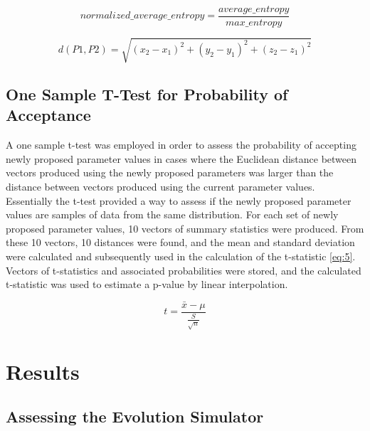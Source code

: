 \documentclass[10pt]{article}
\begin{document}
\begin{equation}
	normalized\_average\_entropy = \frac{average\_entropy}{max\_entropy}
	\label{eq:3}
\end{equation}

\begin{equation}
	d(P1,P2) = \sqrt{(x_2-x_1)^2 + (y_2-y_1)^2 + (z_2-z_1)^2 }
	\label{eq:4}
\end{equation}

\subsection{One Sample T-Test for Probability of Acceptance}

A one sample t-test was employed in order to assess the probability of accepting newly proposed parameter values in cases where the Euclidean distance between vectors produced using the newly proposed parameters was larger than the distance between vectors produced using the current parameter values. Essentially the t-test provided a way to assess if the newly proposed parameter values are samples of data from the same distribution. For each set of newly proposed parameter values, 10 vectors of summary statistics were produced. From these 10 vectors, 10 distances were found, and the mean and standard deviation were calculated and subsequently used in the calculation of the t-statistic \eqref{eq:5}. Vectors of t-statistics and associated probabilities were stored, and the calculated t-statistic was used to estimate a p-value by linear interpolation. 

\begin{equation}
	t = \frac{\bar{x}-\mu}{\frac{S}{\sqrt{n}}}
	\label{eq:5}
\end{equation}

\section{Results}

\subsection{Assessing the Evolution Simulator}
\end{document}
